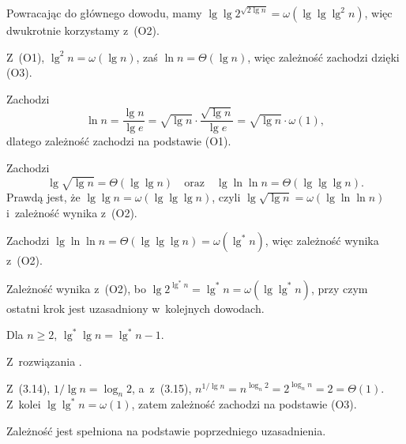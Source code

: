 \begin{description}[font=\textnormal, topsep=2ex, itemsep=2ex]
	Powracając do głównego dowodu, mamy $\lg\lg2^{\sqrt{2\lg n}}=\omega(\lg\lg\lg^2n)$, więc dwukrotnie korzystamy z~(O2).
	\item[$\lg^2n=\omega(\ln n)$:]
	Z~(O1), $\lg^2n=\omega(\lg n)$, zaś $\ln n=\Theta(\lg n)$, więc zależność zachodzi dzięki (O3).
	\item[$\ln n=\omega\bigl(\!\sqrt{\lg n}\bigr)$:]
	Zachodzi
	\[
		\ln n = \frac{\lg n}{\lg e} = \sqrt{\lg n}\cdot\frac{\sqrt{\lg n}}{\lg e} = \sqrt{\lg n}\cdot\omega(1),
	\]
	dlatego zależność zachodzi na podstawie (O1).
	\item[$\sqrt{\lg n}=\omega(\ln\ln n)$:]
	Zachodzi
	\[
		\lg\sqrt{\lg n} = \Theta(\lg\lg n) \quad\text{oraz}\quad \lg\ln\ln n = \Theta(\lg\lg\lg n).
	\]
	Prawdą jest, że $\lg\lg n=\omega(\lg\lg\lg n)$, czyli $\lg\sqrt{\lg n}=\omega(\lg\ln\ln n)$ i~zależność wynika z~(O2).
	\item[$\ln\ln n=\omega\bigl(2^{\lg^*\!n}\bigr)$:]
	Zachodzi $\lg\ln\ln n=\Theta(\lg\lg\lg n)=\omega(\lg^*n)$, więc zależność wynika z~(O2).
	\item[$2^{\lg^*\!n}=\omega(\lg^*n)$:]
	Zależność wynika z~(O2), bo $\lg2^{\lg^*\!n}=\lg^*n=\omega(\lg\lg^*n)$, przy czym ostatni krok jest uzasadniony w~kolejnych dowodach.
	\item[$\lg^*n=\Theta(\lg^*\lg n)$:]
	Dla $n\ge2$, $\lg^*\lg n=\lg^*n-1$.
	\item[$\lg^*\lg n=\omega(\lg\lg^*n)$:]
	Z~rozwiązania .
	\item[$\lg\lg^*n=\omega\bigl(n^{1/\!\lg n}\bigr)$:]
	Z~(3.14), $1/\!\lg n=\log_n2$, a~z~(3.15), $n^{1/\!\lg n}=n^{\log_n2}=2^{\log_nn}=2=\Theta(1)$.
	Z~kolei $\lg\lg^*n=\omega(1)$, zatem zależność zachodzi na podstawie (O3).
	\item[$n^{1/\!\lg n}=\Theta(1)$:]
	Zależność jest spełniona na podstawie poprzedniego uzasadnienia.
\end{description}

